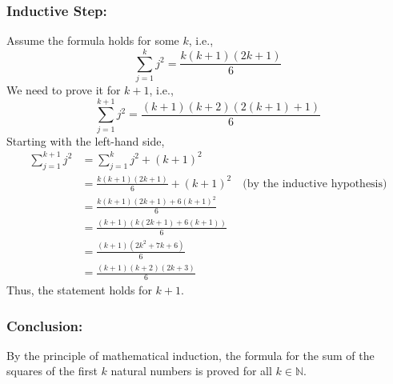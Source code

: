 \documentclass[12pt]{article}
\begin{document}
\subsubsection*{Inductive Step:}
Assume the formula holds for some \( k \), i.e.,
\[ \sum_{j=1}^{k} j^2 = \frac{k(k+1)(2k+1)}{6} \]
We need to prove it for \( k+1 \), i.e.,
\[ \sum_{j=1}^{k+1} j^2 = \frac{(k+1)(k+2)(2(k+1)+1)}{6} \]
Starting with the left-hand side,
\begin{align*}
\sum_{j=1}^{k+1} j^2 &= \sum_{j=1}^{k} j^2 + (k+1)^2 \\
                     &= \frac{k(k+1)(2k+1)}{6} + (k+1)^2 \quad \text{(by the inductive hypothesis)}\\
                     &= \frac{k(k+1)(2k+1) + 6(k+1)^2}{6} \\
                     &= \frac{(k+1)(k(2k+1) + 6(k+1))}{6} \\
                     &= \frac{(k+1)(2k^2 + 7k + 6)}{6} \\
                     &= \frac{(k+1)(k+2)(2k+3)}{6}
\end{align*}
Thus, the statement holds for \( k+1 \).

\subsubsection*{Conclusion:}
By the principle of mathematical induction, the formula for the sum of the squares of the first \( k \) natural numbers is proved for all \( k \in \mathbb{N} \).
\end{document}
